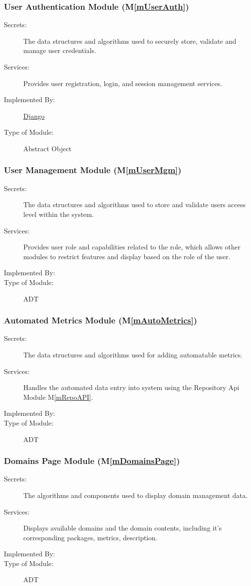 \documentclass[12pt, titlepage]{article}
\newcommand{\mref}[1]{M\ref{#1}}
\begin{document}
\subsubsection{ User Authentication Module (\mref{mUserAuth})}
\begin{description}
\item[Secrets:] The data structures and algorithms used to securely store, validate and manage user credentials.
\item[Services:] Provides user registration, login, and session management services.
\item[Implemented By:] \href{https://www.djangoproject.com/}{Django}
\item[Type of Module:] Abstract Object
\end{description}

\subsubsection{ User Management Module (\mref{mUserMgm})}
\begin{description}
\item[Secrets:] The data structures and algorithms used to store and validate users access level within the system.
\item[Services:] Provides user role and capabilities related to the role, which allows other modules to restrict features and display based on the role of the user.
\item[Implemented By:]  \projname
\item[Type of Module:] ADT
\end{description}

\subsubsection{ Automated Metrics Module (\mref{mAutoMetrics})}
\begin{description}
\item[Secrets:] The data structures and algorithms used for adding automatable metrics.
\item[Services:] Handles the automated data entry into system using the Repository Api Module \mref{mRepoAPI}.
\item[Implemented By:]  \projname
\item[Type of Module:] ADT
\end{description}

\subsubsection{ Domains Page Module (\mref{mDomainsPage})}
\begin{description}
\item[Secrets:] The algorithms and components used to display domain management data.
\item[Services:] Displays available domains and the domain contents, including it's corresponding packages, metrics, description.
\item[Implemented By:] \projname
\item[Type of Module:] ADT
\end{description}
\end{document}
